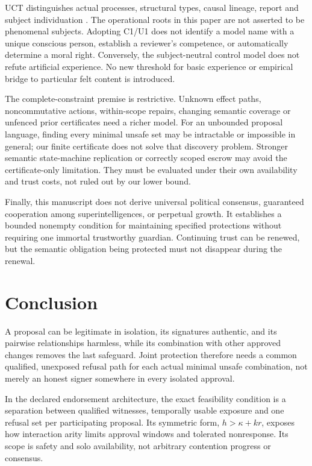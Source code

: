 \documentclass[11pt,a4paper]{article}
\theoremstyle{definition}\newtheorem{definition}{Definition}
\begin{document}
UCT distinguishes actual processes, structural types, causal lineage, report and subject individuation \cite{uct}. The operational roots in this paper are not asserted to be phenomenal subjects. Adopting C1/U1 does not identify a model name with a unique conscious person, establish a reviewer's competence, or automatically determine a moral right. Conversely, the subject-neutral control model does not refute artificial experience. No new threshold for basic experience or empirical bridge to particular felt content is introduced.

The complete-constraint premise is restrictive. Unknown effect paths, noncommutative actions, within-scope repairs, changing semantic coverage or unfenced prior certificates need a richer model. For an unbounded proposal language, finding every minimal unsafe set may be intractable or impossible in general; our finite certificate does not solve that discovery problem. Stronger semantic state-machine replication or correctly scoped escrow may avoid the certificate-only limitation. They must be evaluated under their own availability and trust costs, not ruled out by our lower bound.

Finally, this manuscript does not derive universal political consensus, guaranteed cooperation among superintelligences, or perpetual growth. It establishes a bounded nonempty condition for maintaining specified protections without requiring one immortal trustworthy guardian. Continuing trust can be renewed, but the semantic obligation being protected must not disappear during the renewal.

\section{Conclusion}
A proposal can be legitimate in isolation, its signatures authentic, and its pairwise relationships harmless, while its combination with other approved changes removes the last safeguard. Joint protection therefore needs a common qualified, unexposed refusal path for each actual minimal unsafe combination, not merely an honest signer somewhere in every isolated approval.

In the declared endorsement architecture, the exact feasibility condition is a separation between qualified witnesses, temporally usable exposure and one refusal set per participating proposal. Its symmetric form, $h>\kappa+kr$, exposes how interaction arity limits approval windows and tolerated nonresponse. Its scope is safety and solo availability, not arbitrary contention progress or consensus.
\end{document}
